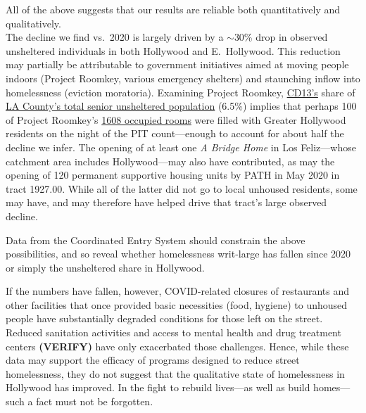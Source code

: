 \documentclass[11pt]{article}
\def\bfr{\bf\color{red}}
\begin{document}

All of the above suggests that our results are reliable both quantitatively and qualitatively.\\

 The decline we find vs.\ 2020 is largely driven by a $\sim$30\% 
drop in observed unsheltered individuals in both Hollywood and E.~Hollywood. This reduction
may partially be attributable to government initiatives aimed at moving people indoors (Project Roomkey, 
various emergency shelters) and staunching inflow into homelessness (eviction moratoria). Examining 
Project Roomkey, \href{https://www.lahsa.org/documents?id=4672-2020-homeless-count-council-district-13}
{CD13's} share of \href{https://www.lahsa.org/documents?id=4585-2020-greater-los-angeles-homeless-count-los-angeles-continuum-of-care-coc-}{LA County's total senior unsheltered population} (6.5\%) implies that perhaps 100 of Project Roomkey's 
\href{https://projectroomkeytracker.com/}{1608 occupied rooms} were filled with Greater Hollywood 
residents on the night of the PIT count---enough to account for about half the decline we infer. 
The opening of at least one {\it A Bridge Home} in Los Feliz---whose catchment area includes Hollywood---may 
also have contributed, as may the opening of 120 permanent supportive housing units by PATH in May 2020 
in tract 1927.00. While all of the latter did not go to local unhoused residents, some may have, and may 
therefore have helped drive that tract's large observed decline. 

Data from the Coordinated Entry System 
should constrain the above possibilities, and so reveal whether homelessness writ-large has fallen since 2020 or 
simply the unsheltered share in Hollywood.

If the numbers have fallen, however, COVID-related closures of restaurants and other facilities that
once provided basic necessities (food, hygiene) to unhoused people have substantially degraded conditions 
for those left on the street. Reduced sanitation activities and access to mental health and drug treatment centers 
{\bfr (VERIFY)} have only exacerbated those challenges. Hence, while these data may support the efficacy of 
programs designed to reduce street homelessness, they do not suggest that the qualitative state of homelessness 
in Hollywood has improved. In the fight to rebuild lives---as well as build homes---such a fact must not be forgotten.
\end{document}
